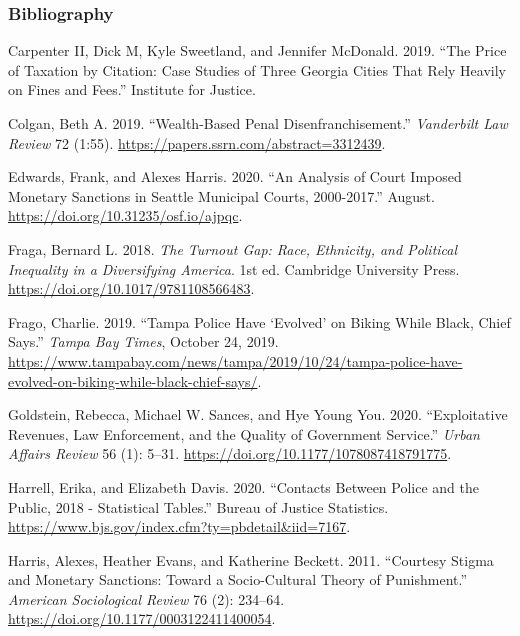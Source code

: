\documentclass[
  12pt,
]{article}
\newlength{\cslhangindent}
\newenvironment{cslreferences}%
  {\setlength{\parindent}{0pt}%
  \everypar{\setlength{\hangindent}{\cslhangindent}}\ignorespaces}%
  {\par}
\begin{document}
\hypertarget{bibliography}{%
\subsubsection*{Bibliography}\label{bibliography}}

\hypertarget{refs}{}
\begin{cslreferences}
\leavevmode\hypertarget{ref-CarpenterII2019}{}%
Carpenter II, Dick M, Kyle Sweetland, and Jennifer McDonald. 2019. ``The Price of Taxation by Citation: Case Studies of Three Georgia Cities That Rely Heavily on Fines and Fees.'' Institute for Justice.

\leavevmode\hypertarget{ref-Colgan2019}{}%
Colgan, Beth A. 2019. ``Wealth-Based Penal Disenfranchisement.'' \emph{Vanderbilt Law Review} 72 (1:55). \url{https://papers.ssrn.com/abstract=3312439}.

\leavevmode\hypertarget{ref-Edwards2020}{}%
Edwards, Frank, and Alexes Harris. 2020. ``An Analysis of Court Imposed Monetary Sanctions in Seattle Municipal Courts, 2000-2017.'' August. \url{https://doi.org/10.31235/osf.io/ajpqc}.

\leavevmode\hypertarget{ref-Fraga2018}{}%
Fraga, Bernard L. 2018. \emph{The Turnout Gap: Race, Ethnicity, and Political Inequality in a Diversifying America}. 1st ed. Cambridge University Press. \url{https://doi.org/10.1017/9781108566483}.

\leavevmode\hypertarget{ref-Frago2019}{}%
Frago, Charlie. 2019. ``Tampa Police Have `Evolved' on Biking While Black, Chief Says.'' \emph{Tampa Bay Times}, October 24, 2019. \url{https://www.tampabay.com/news/tampa/2019/10/24/tampa-police-have-evolved-on-biking-while-black-chief-says/}.

\leavevmode\hypertarget{ref-Goldstein2020}{}%
Goldstein, Rebecca, Michael W. Sances, and Hye Young You. 2020. ``Exploitative Revenues, Law Enforcement, and the Quality of Government Service.'' \emph{Urban Affairs Review} 56 (1): 5--31. \url{https://doi.org/10.1177/1078087418791775}.

\leavevmode\hypertarget{ref-Harrell2020}{}%
Harrell, Erika, and Elizabeth Davis. 2020. ``Contacts Between Police and the Public, 2018 - Statistical Tables.'' Bureau of Justice Statistics. \url{https://www.bjs.gov/index.cfm?ty=pbdetail\&iid=7167}.

\leavevmode\hypertarget{ref-Harris2011}{}%
Harris, Alexes, Heather Evans, and Katherine Beckett. 2011. ``Courtesy Stigma and Monetary Sanctions: Toward a Socio-Cultural Theory of Punishment.'' \emph{American Sociological Review} 76 (2): 234--64. \url{https://doi.org/10.1177/0003122411400054}.


\end{cslreferences}
\end{document}
